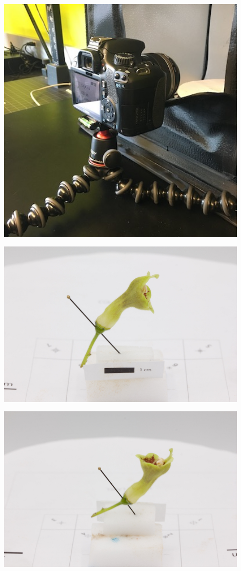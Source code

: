 \documentclass[
]{book}
\theoremstyle{definition}
\theoremstyle{definition}
\theoremstyle{definition}
\theoremstyle{definition}
\theoremstyle{remark}
\begin{document}
\includegraphics[width=0.9\textwidth,height=\textheight]{Figures/camera_position_3.JPG}

\includegraphics[width=0.9\textwidth,height=\textheight]{Figures/position_2.jpg}

\includegraphics[width=0.9\textwidth,height=\textheight]{Figures/position_5.jpg}
\end{document}
